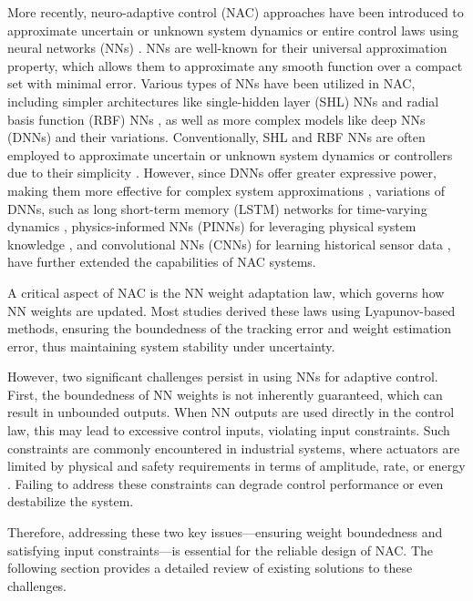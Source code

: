 \documentclass[letterpaper, journal]{IEEEtran}
\providecommand{\DIFadd}[1]{{\protect\color{blue}\uwave{#1}}} %
\providecommand{\DIFaddbegin}{} %
\providecommand{\DIFaddend}{} %
\begin{document}
More recently, neuro-adaptive control (NAC) approaches have been introduced to approximate uncertain or unknown system dynamics or entire control laws using neural networks (NNs) \cite{Lewis:1998aa,Farrell:2006aa}. 
NNs are well-known for their universal approximation property, which allows them to approximate any smooth function over a compact set with minimal error. 
Various types of NNs have been utilized in NAC, including simpler architectures like single-hidden layer (SHL) NNs \cite{Lewis:1996aa,Ge:2010aa, Yesildirek:1995aa,Ryu:2024aa,Ryu:2025aa} and radial basis function (RBF) NNs \cite{Liu:2013ab,Ge:2002aa}, as well as more complex models like deep NNs (DNNs) \cite{Patil:2022aa} and their variations. 
Conventionally, SHL and RBF NNs are often employed to approximate uncertain or unknown system dynamics or controllers due to their simplicity \cite{Esfandiari:2014aa,Esfandiari:2015aa,Yesildirek:1995aa,Gao:2006aa}.
However, since DNNs offer greater expressive power, making them more effective for complex system approximations \cite{Rolnick:2018aa}, variations of DNNs, such as long short-term memory (LSTM) networks for time-varying dynamics \cite{Griffis:2023aa}, physics-informed NNs (PINNs) for leveraging physical system knowledge \cite{Hart:2024aa}, and convolutional NNs (CNNs) for learning \DIFaddbegin \DIFadd{from }\DIFaddend historical sensor data \cite{Ryu:2024ac}, have further extended the capabilities of NAC systems.

A critical aspect of NAC is the NN weight adaptation law, which governs how NN weights are updated. 
Most studies derived these laws using Lyapunov-based methods, ensuring the boundedness of the tracking error and weight estimation error, thus maintaining system stability under uncertainty.

However, two significant challenges persist in using NNs for adaptive control. 
First, the boundedness of NN weights is not inherently guaranteed, which can result in unbounded outputs. 
When NN outputs are used directly in the control law, this may lead to excessive control inputs, violating input constraints. 
Such constraints are commonly encountered in industrial systems, where actuators are limited by physical and safety requirements in terms of amplitude, rate, or energy \cite{Esfandiari:2021aa}. 
Failing to address these constraints can degrade control performance or even destabilize the system.

Therefore, addressing these two key issues—ensuring weight boundedness and satisfying input constraints—is essential for the reliable design of NAC. 
The following section provides a detailed review of existing solutions to these challenges.
\end{document}
